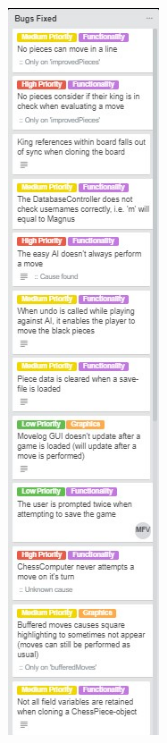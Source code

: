 \documentclass{article}
\begin{document}
\includegraphics[width=4cm]{20180508-bugsfixed1.jpg}
\end{document}

